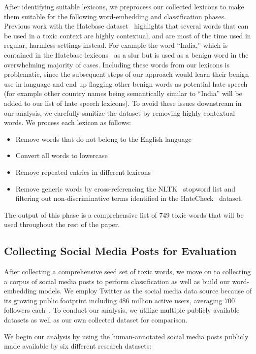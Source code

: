 After identifying suitable lexicons, we preprocess our collected lexicons to make them suitable for the following word-embedding and classification phases.
Previous work with the Hatebase dataset~\cite{hine2017kek} highlights that several words that can be used in a toxic context are highly contextual, and are most of the
time used in regular, harmless settings instead.
For example the word ``India,'' which is contained
in the Hatebase lexicons~\cite{hatebase} as a slur but is used as a benign word in the overwhelming majority of cases. Including these words from our lexicons is problematic, since the subsequent steps of our approach would learn their benign use in language and end up flagging other benign words as potential hate speech (for example other country names being semantically similar to ``India'' will be added to our list of hate speech lexicons).
To avoid these issues downstream in our analysis, we carefully sanitize the dataset by removing
highly contextual words. 
We process each lexicon as follows:
\begin{itemize}
	\item Remove words that do not belong to the English language
	\item Convert all words to lowercase
	\item Remove repeated entries in different lexicons
        \item Remove generic words by cross-referencing the NLTK~\cite{nltk} stopword list and filtering out non-discriminative terms identified in the HateCheck~\cite{rottger-etal-2021-hatecheck} dataset.
\end{itemize}
The output of this phase is a comprehensive list of 749 toxic words that will be used throughout the rest of the paper. 

\subsection{Collecting Social Media Posts for Evaluation}\label{testset}
After collecting a comprehensive seed set of toxic words, we move on to collecting a corpus of social media posts to perform classification as well as build our word-embedding models.
We employ Twitter as the social media data source because of its growing public footprint including 486 million active users, averaging 700 followers each~\cite{twitter-carbon-footprint}.
To conduct our analysis, we utilize multiple publicly available datasets as well as our own collected dataset for comparison.

We begin our analysis by using the human-annotated social media posts publicly made available by six different research datasets:


